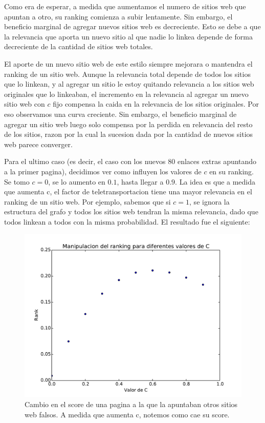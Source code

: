 Como era de esperar, a medida que aumentamos el numero de sitios web que apuntan a otro, su ranking comienza a subir lentamente. Sin embargo, el beneficio marginal de agregar nuevos sitios web es decreciente. Esto se debe a que la relevancia que aporta un nuevo sitio al que nadie lo linkea depende de forma decreciente de la cantidad de sitios web totales.

El aporte de un nuevo sitio web de este estilo siempre mejorara o mantendra el ranking de un sitio web. Aunque la relevancia total depende de todos los sitios que lo linkean, y al agregar un sitio le estoy quitando relevancia a los sitios web originales que lo linkeaban, el incremento en la relevancia al agregar un nuevo sitio web con $c$ fijo compensa la caida en la relevancia de los sitios originales. Por eso observamos una curva creciente. Sin embargo, el beneficio marginal de agregar un sitio web luego solo compensa por la perdida en relevancia del resto de los sitios, razon por la cual la sucesion dada por la cantidad de nuevos sitios web parece converger.

Para el ultimo caso (es decir, el caso con los nuevos 80 enlaces extras apuntando a la primer pagina), decidimos ver como influyen los valores de $c$ en su ranking. Se tomo $c = 0$, se lo aumento en $0.1$, hasta llegar a $0.9$. La idea es que a medida que aumenta c, el factor de teletransportacion tiene una mayor relevancia en el ranking de un sitio web. Por ejemplo, sabemos que si $c = 1$, se ignora la estructura del grafo y todos los sitios web tendran la misma relevancia, dado que todos linkean a todos con la misma probabilidad. El resultado fue el siguiente:

\begin{figure}[H]
\centering
\includegraphics[scale=0.7]{images/manipulacionC.pdf}
\caption{Cambio en el score de una pagina a la que la apuntaban otros sitios web falsos. A medida que aumenta c, notemos como cae su score.}
\label{timePageRank}
\end{figure}

